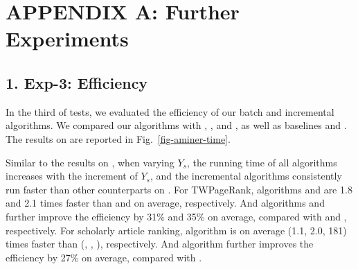\vspace{-1ex}
\section*{APPENDIX A: Further Experiments}
\label{sec-exp-app}


\subsection*{1. Exp-3: Efficiency}

In the third of tests, we evaluated the efficiency of our batch and incremental algorithms.
We compared our algorithms with \powensemble, \powtwprdag, and \powtwprscc, as well as baselines \futurerank and \hhgrank.
The results on \aminer are reported in Fig.~\ref{fig-aminer-time}.

Similar to the results on \magdata, when varying $Y_s$, the running time of all algorithms increases with the increment of $Y_s$, and the incremental algorithms
consistently run faster than other counterparts on \aminer.
For TWPageRank, algorithms \twprdag and \twprscc
are 1.8 and 2.1 times faster than \powtwprdag and \powtwprscc on average, respectively. And algorithms \inctwprdag and \inctwprscc further improve the efficiency  by 31\% and 35\% on average, compared with \twprdag and \twprscc, respectively.
%
For scholarly article ranking, algorithm \batensemble is on average (1.1, 2.0, 181) times faster than (\powensemble, \futurerank, \hhgrank), respectively.
And algorithm \incensemble further improves the efficiency by 27\% on average, compared with \batensemble.


